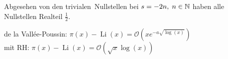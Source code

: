 \begin{frame}
    \begin{theorem}
        Abgesehen von den \glqq trivialen\grqq\ Nullstellen bei $s = -2n,\; n\in \mathbb{N}$ haben alle Nullstellen Realteil $\frac{1}{2}$.
    \end{theorem}
    de la Vallée-Poussin: $\pi(x) - \operatorname{Li}(x) = \mathcal{O}(xe^{-a\sqrt{\log(x)}})$\\
    mit RH: $\pi(x) - \operatorname{Li}(x) = \mathcal{O}(\sqrt{x}\log(x))$
\end{frame}